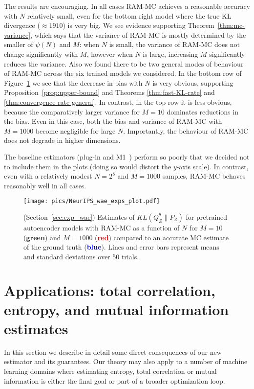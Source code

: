 The results are encouraging. 
In all cases RAM-MC achieves a reasonable accuracy with $N$ relatively small, even for the bottom right model where the true KL divergence ($\approx 1910$) is very big.
We see evidence supporting Theorem~\ref{thm:mc-variance}, which says that the variance of RAM-MC is mostly determined by the smaller of $\psi(N)$ and $M$:
when $N$ is small, the variance of RAM-MC does not change significantly with $M$, 
however when $N$ is large, increasing $M$ significantly reduces the variance. 
Also we found there to be two general modes of behaviour of RAM-MC across the six trained models we considered. 
In the bottom row of Figure~\ref{fig:real-exps} we see that the decrease in bias with $N$ is very obvious, supporting Proposition~\ref{prop:upper-bound} and Theorems \ref{thm:fast-KL-rate} and \ref{thm:convergence-rate-general}.
In contrast, in the top row it is less obvious, because the comparatively larger variance for $M{=}10$ dominates reductions in the bias.
Even in this case, both the bias and variance of RAM-MC with $M{=}1000$ become negligible for large $N$.
Importantly, the behaviour of RAM-MC does not degrade in higher dimensions.


The baseline estimators (plug-in \cite{moon14ensemble} and M1~\cite{nguyen10ratio}) perform so poorly that we decided not to include them in the plots (doing so would distort the $y$-axis scale).
In contrast, even with a relatively modest $N{=}2^8$ and $M{=}1000$ samples, RAM-MC behaves reasonably well in all cases.

\begin{figure}
\begin{center}
\texttt{[image: pics/NeurIPS\_wae\_exps\_plot.pdf]}
\end{center}
\caption{\label{fig:real-exps}
(Section~\ref{sec:exp_wae}) Estimates of $KL(Q_Z^\theta \| P_Z)$ for pretrained autoencoder models with RAM-MC as a function of $N$ for $M{=}10$ ({\bf \textcolor{green!65!blue}{green}}) and $M{=}1000$ ({\bf \textcolor{red}{red}}) compared to an accurate MC estimate of the ground truth ({\bf\textcolor{blue}{blue}}).
Lines and error bars represent means and standard deviations over 50 trials.
}
\end{figure}



\section{Applications: total correlation, entropy, and mutual information estimates}\label{sec:applications}
In this section we describe in detail some direct consequences of our new estimator and its guarantees.
Our theory may also apply to a number of machine learning domains where estimating entropy, total correlation or mutual information is either the final goal or part of a broader optimization loop.
